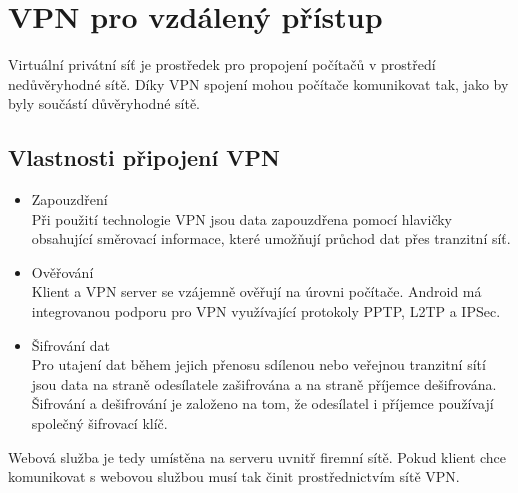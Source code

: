 \documentclass{diplomka}
\begin{document}
\section{VPN pro vzdálený přístup}
Virtuální privátní síť  je prostředek pro propojení počítačů v prostředí nedůvěryhodné sítě. Díky VPN spojení mohou počítače komunikovat tak, jako by byly součástí důvěryhodné sítě.

\subsection*{Vlastnosti připojení VPN}
\begin{itemize}[noitemsep,nolistsep]
\item Zapouzdření\\ Při použití technologie VPN jsou data zapouzdřena pomocí hlavičky obsahující směrovací informace, které umožňují průchod dat přes tranzitní síť.
\item Ověřování\\
Klient a VPN server se vzájemně ověřují na úrovni počítače. Android má integrovanou podporu pro VPN využívající protokoly PPTP, L2TP a IPSec.
\item Šifrování dat\\
Pro utajení dat během jejich přenosu sdílenou nebo veřejnou tranzitní sítí jsou data na straně odesílatele zašifrována a na straně příjemce dešifrována. Šifrování a dešifrování je založeno na tom, že odesílatel i příjemce používají společný šifrovací klíč.
\end{itemize}

Webová služba je tedy umístěna na serveru uvnitř firemní sítě. Pokud klient chce komunikovat s webovou službou musí tak činit 
prostřednictvím sítě VPN.
\end{document}
